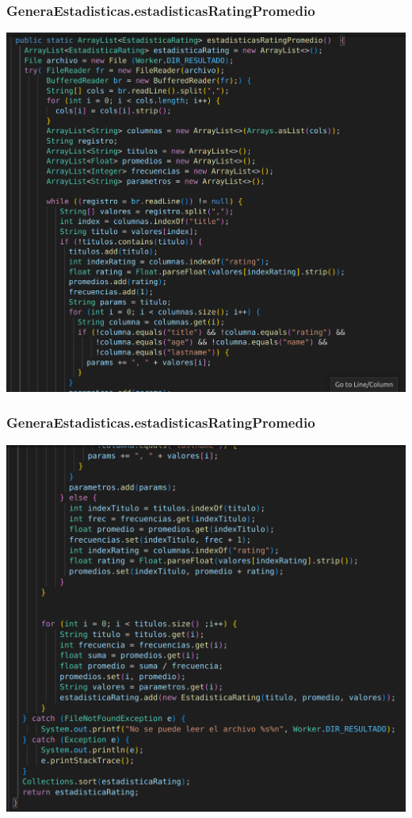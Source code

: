\documentclass{beamer}
\begin{document}
\begin{frame}
\frametitle{GeneraEstadisticas.estadisticasRatingPromedio}
\includegraphics[width=0.9\linewidth]{generaestadisticas_estadisticasratingpromedio1}
\end{frame}

\begin{frame}
\frametitle{GeneraEstadisticas.estadisticasRatingPromedio}
\includegraphics[width=0.9\linewidth]{generaestadisticas_estadisticasratingpromedio2}
\end{frame}
\end{document}
